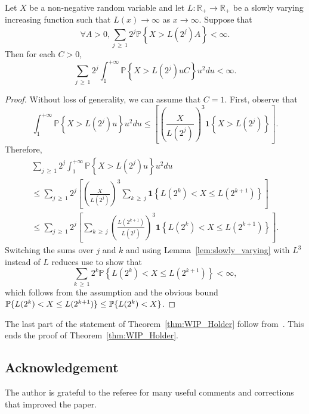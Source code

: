 \documentclass[AHL,Unicode,longabstracts,published]{cedram}
\newcommand{\bfun}{\mathbf{1}}
\newcommand\R{\mathbb{R}}
\newcommand\PP{\mathbb{P}}
\newcommand{\pr}[1]{(#1)}
\let\oldforall\forall
\renewcommand*{\forall}{\mathrel{\oldforall}}
\begin{document}
\begin{lemm}\label{lem:slowly_varying}
Let $X$ be a non-negative random variable and let $L\colon \R_{+}\to \R_{+}$ be a slowly varying increasing function such that $L\pr{x}\to \infty$ as $x\to \infty$. Suppose that
\begin{equation}
\forall A>0, \sum_{j\,\geq\,1}2^j\PP\left\{X>L\left(2^j\right)A\right\}<\infty.
\end{equation}
Then for each $C>0$,
\begin{equation}
\sum_{j\,\geq\,1}2^j\int_1^{+\infty}\PP\left\{X>L\left(2^j\right)uC\right\} u^{2}du<\infty.
\end{equation}
\end{lemm}
\begin{proof}
Without loss of generality, we can assume that $C=1$. First, observe that
\begin{equation}
\int_1^{+\infty}\PP\left\{X>L\left(2^j\right)u\right\} u^{2}du\leq \left[\left(\frac{X}{L\left(2^j\right)}\right)^{3}\bfun\left\{X>L\left(2^j\right) \right\}\right].
\end{equation}
Therefore,
\begin{multline}
\sum_{j\,\geq\,1}2^j\int_1^{+\infty}\PP\left\{X>L\left(2^j\right)u\right\} u^{2}du \\
\leq \sum_{j\,\geq\,1}2^j\left[\left(\frac{X}{L\left(2^j\right)}\right)^{3}\sum_{k\,\geq\,j}\bfun\left\{ L\left(2^k\right)<X\leq L\left(2^{k+1}\right) \right\}\right]\\
\leq \sum_{j\,\geq\,1}2^j\left[\sum_{k\,\geq\,j}\left(\frac{L\left(2^{k+1}\right) }{L\left(2^j\right)}\right)^{3}\bfun\left\{ L\left(2^k\right)<X\leq L\left(2^{k+1}\right) \right\}\right].
\end{multline}
Switching the sums over $j$ and $k$ and using Lemma~\ref{lem:slowly_varying} with $L^3$ instead of $L$ reduces use to show that
\begin{equation}
\sum_{k\,\geq\,1} 2^k\PP\left\{ L\left(2^k\right)<X\leq L\left(2^{k+1}\right) \right\}<\infty,
\end{equation}
which follows from the assumption and the obvious bound $\PP\{ L\pr{2^k}<X\leq L\pr{2^{k+1}} \} \linebreak\leq
\PP\{ L\pr{2^k}<X \}$.
\end{proof}



The last part of the statement of Theorem~\ref{thm:WIP_Holder} follow from~\cite{MR3913270}. This ends the proof of Theorem~\ref{thm:WIP_Holder}.


\subsection*{Acknowledgement}
The author is grateful to the referee for many useful comments and corrections that improved the paper.


\end{document}
